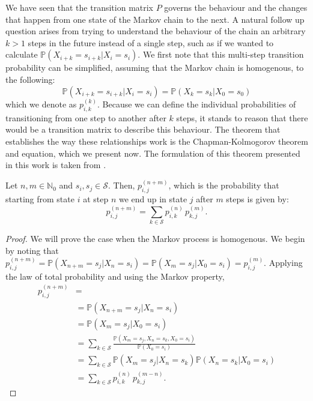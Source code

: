 We have seen that the transition matrix $P$ governs the behaviour and the changes that happen from one state of the Markov chain to the next. 
A natural follow up question arises from trying to understand the behaviour of the chain an arbitrary $k > 1$ steps in the future instead of a single step, such as if we wanted to calculate $\mathbb{P}(X_{i+k} = s_{i+k} | X_i = s_i)$. 
We first note that this multi-step transition probability can be simplified, assuming that the Markov chain is homogenous, to the following: 
\[ \mathbb{P}(X_{i+k} = s_{i+k} | X_i = s_i) = \mathbb{P}(X_{k} = s_{k} | X_0 = s_0) \]
which we denote as $p_{i,k}^{(k)}$. Because we can define the individual probabilities of transitioning from one step to another after $k$ steps, it stands to reason that there would be a transition matrix to describe this behaviour.
The theorem that establishes the way these relationships work is the Chapman-Kolmogorov theorem and equation, which we present now. The formulation of this theorem presented in this work is taken from \cite[\S 8.3]{Zitkovic_2010}. 

\begin{theorem}
	Let $n,m \in \mathbb{N}_0$ and $s_i, s_j \in \mathcal{S}$. Then, $p_{i,j}^{(n+m)}$, which is the probability that starting from state $i$ at step $n$ we end up in state $j$ after $m$ steps is given by: 
	\[ p_{i,j}^{(n+m)}  = \sum_{k \in \mathcal{S}} p_{i,k}^{(n)} \, p_{k,j}^{(m)}. \]
\end{theorem} 

\begin{proof}
	We will prove the case when the Markov process is homogenous. We begin by noting that $p_{i,j}^{(n+m)} = \mathbb{P}(X_{n+m} = s_j | X_n = s_i) = \mathbb{P}(X_m = s_j | X_0 = s_i) = p_{i,j}^{(m)}$. Applying the law of total probability and using the Markov property, 
	\begin{align*} 
		p_{i,j}^{(n+m)} &= \\ 
		&= \mathbb{P}(X_{n+m} = s_j | X_n = s_i) \\
		&= \mathbb{P}(X_{m} = s_j | X_0 = s_i) \\
		&= \sum_{k \in \mathcal{S}} \frac{\mathbb{P}(X_m = s_j, X_{n} = s_k, X_0 = s_i)}{\mathbb{P}(X_0 = s_i)} \\
		&= \sum_{k \in \mathcal{S}} \mathbb{P}(X_m = s_j | X_n = s_k) \mathbb{P}(X_n = s_k | X_0 = s_i) \\
		&= \sum_{k \in \mathcal{S}} p_{i,k}^{(n)} \, p_{k,j}^{(m-n)}. 
	\end{align*}
\end{proof}

